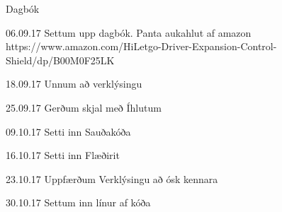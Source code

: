 Dagbók

06.09.17
Settum upp dagbók. Panta aukahlut af amazon https://www.amazon.com/HiLetgo-Driver-Expansion-Control-Shield/dp/B00M0F25LK

18.09.17
Unnum að verklýsingu

25.09.17
Gerðum skjal með Íhlutum

09.10.17
Setti inn Sauðakóða

16.10.17
Setti inn Flæðirit

23.10.17
Uppfærðum Verklýsingu að ósk kennara

30.10.17
Settum inn línur af kóða